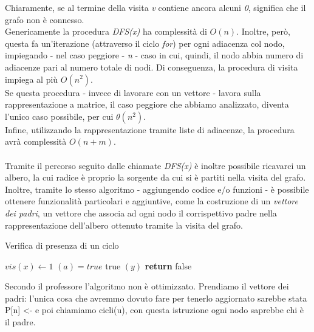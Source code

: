 Chiaramente, se al termine della visita \textit{v} contiene ancora alcuni \textit{0}, significa che il grafo non è connesso. \\
Genericamente la procedura \textit{DFS(x)} ha complessità di $O(n)$. Inoltre, però, questa fa un'iterazione (attraverso il ciclo \textit{for}) per ogni adiacenza col nodo, impiegando - nel caso peggiore - \textit{n} - caso in cui, quindi, il nodo abbia numero di adiacenze pari al numero totale di nodi. Di conseguenza, la procedura di visita impiega al più $O(n^2)$. \\
Se questa procedura - invece di lavorare con un vettore - lavora sulla rappresentazione a matrice, il caso peggiore che abbiamo analizzato, diventa l'unico caso possibile, per cui $\theta(n^2)$. \\
Infine, utilizzando la rappresentazione tramite liste di adiacenze, la procedura avrà complessità $O(n+m)$. \\\\
Tramite il percorso seguito dalle chiamate \textit{DFS(x)} è inoltre possibile ricavarci un albero, la cui radice è proprio la sorgente da cui si è partiti nella visita del grafo. \\
Inoltre, tramite lo stesso algoritmo - aggiungendo codice e/o funzioni - è possibile ottenere funzionalità particolari e aggiuntive, come la costruzione di un \textit{vettore dei padri}, un vettore che associa ad ogni nodo il corrispettivo padre nella rappresentazione dell'albero ottenuto tramite la visita del grafo.
\newpage

\begin{algorithm}
    \caption{Verifica di presenza di un ciclo}\label{alg:VPC}
    \begin{algorithmic}[1]
            \State $ {vis}(x) \gets 1$ 
             
                \If ${ (a)= {true} }$
                    \Return true $(y)$ 
                \EndIf
            \EndFor
            \State \textbf{return} false\Comment{}
        \EndFunction
    \end{algorithmic}
\end{algorithm}

Secondo il professore l'algoritmo non è ottimizzato.
Prendiamo il vettore dei padri: l'unica cosa che avremmo dovuto fare per tenerlo aggiornato sarebbe stata P[n] <- e poi chiamiamo cicli(u), con questa istruzione ogni nodo saprebbe chi è il padre.

